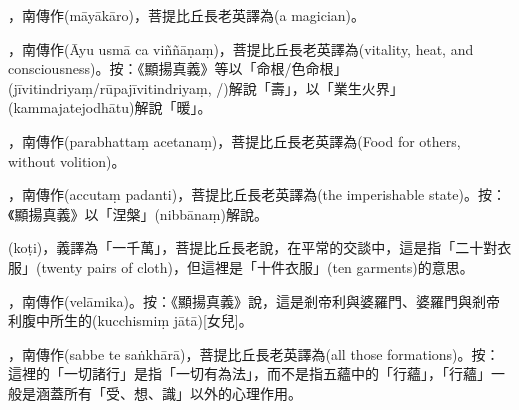 \startitemgroup[noteitems]
\item{}，南傳作(māyākāro)，菩提比丘長老英譯為(a magician)。
\stopitemgroup

\startitemgroup[noteitems]
\item{}，南傳作(Āyu usmā ca viññāṇaṃ)，菩提比丘長老英譯為(vitality, heat, and consciousness)。按：《顯揚真義》等以「命根/色命根」(jīvitindriyaṃ/rūpajīvitindriyaṃ, /)解說「壽」，以「業生火界」(kammajatejodhātu)解說「暖」。
\stopitemgroup

\startitemgroup[noteitems]
\item{}，南傳作(parabhattaṃ acetanaṃ)，菩提比丘長老英譯為(Food for others, without volition)。
\stopitemgroup

\startitemgroup[noteitems]
\item{}，南傳作(accutaṃ padanti)，菩提比丘長老英譯為(the imperishable state)。按：《顯揚真義》以「涅槃」(nibbānaṃ)解說。
\stopitemgroup

\startitemgroup[noteitems]
\item{}(koṭi)，義譯為「一千萬」，菩提比丘長老說，在平常的交談中，這是指「二十對衣服」(twenty pairs of cloth)，但這裡是「十件衣服」(ten garments)的意思。
\stopitemgroup

\startitemgroup[noteitems]
\item{}，南傳作(velāmika)。按：《顯揚真義》說，這是剎帝利與婆羅門、婆羅門與剎帝利腹中所生的(kucchismiṃ jātā)[女兒]。
\stopitemgroup

\startitemgroup[noteitems]
\item{}，南傳作(sabbe te saṅkhārā)，菩提比丘長老英譯為(all those formations)。按：這裡的「一切諸行」是指「一切有為法」，而不是指五蘊中的「行蘊」，「行蘊」一般是涵蓋所有「受、想、識」以外的心理作用。
\stopitemgroup

